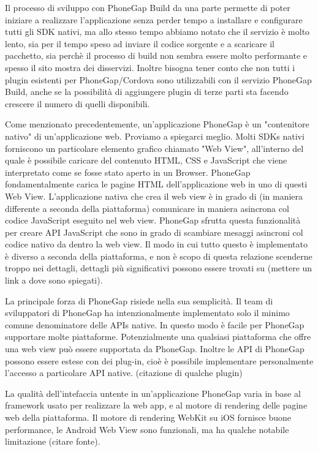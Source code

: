 			Il processo di sviluppo con PhoneGap Build da una parte permette di 
			poter iniziare a realizzare l'applicazione senza perder tempo a 
			installare e configurare tutti gli SDK nativi, ma allo stesso tempo 
			abbiamo notato che il servizio è molto lento, sia per il tempo speso  
			ad inviare il codice sorgente e a scaricare il pacchetto, sia perchè 
			il processo 
			di build non sembra essere molto performante e spesso il sito mostra 
			dei disservizi. Inoltre bisogna tener conto che non tutti i plugin 
			esistenti per PhoneGap/Cordova sono utilizzabili con il servizio 
			PhoneGap Build, anche se la possibilità di aggiungere plugin di terze 
			parti sta facendo crescere il numero di quelli disponibili.
			
			Come menzionato precedentemente, un'applicazione PhoneGap è un 
			"contenitore nativo" di un'applicazione web. Proviamo a spiegarci 
			meglio.
			Molti SDKs nativi forniscono un particolare elemento grafico chiamato 
			"Web View", all'interno del quale è possibile caricare del contenuto 
			HTML, CSS e JavaScript che viene interpretato come se fosse stato aperto in 
			un Browser. 
			PhoneGap fondamentalmente carica le pagine HTML dell'applicazione web 
			in uno di questi Web View. L'applicazione nativa che crea il web view 
			è in grado di (in maniera differente a seconda della piattaforma) 
			comunicare in maniera asincrona col codice JavaScript eseguito nel 
			web view. 
			PhoneGap sfrutta questa funzionalità per creare API JavaScript 
			che sono in grado di scambiare mesaggi asincroni col codice 
			nativo da dentro la web view.  
			Il modo in cui tutto questo è implementato è diverso a seconda della 
			piattaforma, e non è scopo di questa relazione scenderne troppo nei 
			dettagli, dettagli più significativi possono essere trovati su 
			(mettere un link a dove sono spiegati).
			
			La principale forza di PhoneGap risiede nella sua semplicità. 
			Il team di sviluppatori di PhoneGap ha intenzionalmente implementato 
			solo il minimo comune denominatore delle APIs native. In questo modo 
			è facile per PhoneGap supportare molte piattaforme. Potenzialmente 
			una qualsiasi piattaforma che offre una web view può essere supportata 
			da PhoneGap.
			Inoltre le API di PhoneGap possono essere estese con dei plug-in, cioè 
			è possibile implementare personalmente l'accesso a particolare API native.
			(citazione di qualche plugin)
			
			La qualità dell'intefaccia untente in un'applicazione PhoneGap 
			varia in base al framework usato per realizzare la web app, e al 
			motore di rendering delle pagine web della piattaforma.
			Il motore di rendering WebKit su iOS fornisce buone performance, le 
			Android Web View sono funzionali, ma ha qualche notabile limitazione 
			(citare fonte).
			


